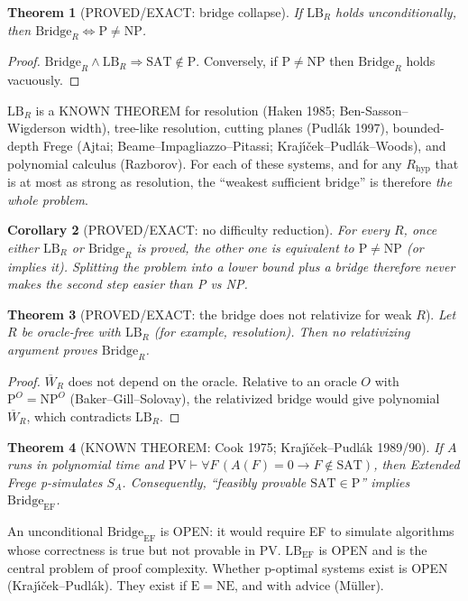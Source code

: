 \documentclass[11pt]{article}
\newtheorem{theorem}{Theorem}
\newtheorem{corollary}[theorem]{Corollary}
\theoremstyle{definition}
\newcommand{\WR}{\overline W_R}
\begin{document}
\begin{theorem}[PROVED/EXACT: bridge collapse]\label{t:collapse}
If $\mathrm{LB}_R$ holds unconditionally, then $\mathrm{Bridge}_R\iff\mathrm{P}\ne\mathrm{NP}$.
\end{theorem}
\begin{proof}
$\mathrm{Bridge}_R\wedge\mathrm{LB}_R\Rightarrow\mathrm{SAT}\notin\mathrm{P}$.
Conversely, if $\mathrm{P}\neq\mathrm{NP}$ then $\mathrm{Bridge}_R$ holds vacuously.
\end{proof}
$\mathrm{LB}_R$ is a KNOWN THEOREM for resolution (Haken 1985; Ben-Sasson--Wigderson width),
tree-like resolution, cutting planes (Pudl\'ak 1997), bounded-depth Frege
(Ajtai; Beame--Impagliazzo--Pitassi; Kraj\'{\i}\v{c}ek--Pudl\'ak--Woods),
and polynomial calculus (Razborov). For each of these systems, and for any
$R_{\mathrm{hyp}}$ that is at most as strong as resolution, the ``weakest sufficient bridge''
is therefore \emph{the whole problem}.

\begin{corollary}[PROVED/EXACT: no difficulty reduction]\label{c:dichot}
For every $R$, once either $\mathrm{LB}_R$ or $\mathrm{Bridge}_R$ is proved, the other one
is equivalent to $\mathrm{P}\ne\mathrm{NP}$ (or implies it).
Splitting the problem into a lower bound plus a bridge therefore never makes the
second step easier than P vs NP.
\end{corollary}

\begin{theorem}[PROVED/EXACT: the bridge does not relativize for weak $R$]\label{t:rel}
Let $R$ be oracle-free with $\mathrm{LB}_R$ (for example, resolution). Then no relativizing
argument proves $\mathrm{Bridge}_R$.
\end{theorem}
\begin{proof}
$\WR$ does not depend on the oracle. Relative to an oracle $O$ with
$\mathrm{P}^O=\mathrm{NP}^O$ (Baker--Gill--Solovay), the relativized bridge would give
polynomial $\WR$, which contradicts $\mathrm{LB}_R$.
\end{proof}

\begin{theorem}[KNOWN THEOREM: Cook 1975; Kraj\'{\i}\v{c}ek--Pudl\'ak 1989/90]\label{t:ef}
If $A$ runs in polynomial time and $\mathrm{PV}\vdash\forall F\,(A(F)=0\to F\notin\mathrm{SAT})$,
then Extended Frege p-simulates $S_A$. Consequently, ``feasibly provable
$\mathrm{SAT}\in\mathrm{P}$'' implies $\mathrm{Bridge}_{\mathrm{EF}}$.
\end{theorem}
An unconditional $\mathrm{Bridge}_{\mathrm{EF}}$ is OPEN: it would require EF to simulate
algorithms whose correctness is true but not provable in PV. $\mathrm{LB}_{\mathrm{EF}}$ is OPEN
and is the central problem of proof complexity. Whether p-optimal systems exist is OPEN
(Kraj\'{\i}\v{c}ek--Pudl\'ak). They exist if $\mathrm{E}=\mathrm{NE}$, and with advice (M\"uller).
\end{document}

